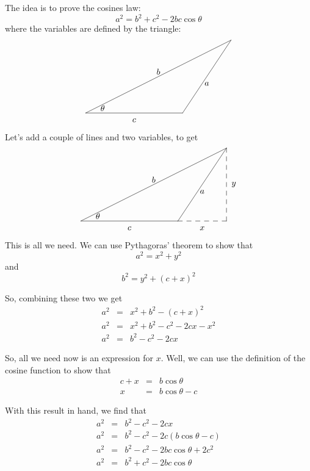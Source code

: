\documentclass{article}
\begin{document}
The idea is to prove the cosines law:
\[
a^2 = b^2 + c^2 - 2bc\cos\theta
\]
where the variables are defined by the triangle:
\[
\begin{xy}
,(0,0)
;(40,0)**@{-}
;(60,30)**@{-}
;(0,0)**@{-}
,(20,-3)*{c}
,(7,2)*{\theta}
,(50,12)*{a}
,(30,17)*{b}
\end{xy}
\]

Let's add a couple of lines and two variables, to get
\[
\begin{xy}
,(0,0)
;(40,0)**@{-}
;(60,30)**@{-}
;(0,0)**@{-}
,(20,-3)*{c}
,(7,2)*{\theta}
,(50,12)*{a}
,(30,17)*{b}
,(40,0)
;(60,0)**@{--}
;(60,30)**@{--}
,(50,-3)*{x}
,(63,15)*{y}
\end{xy}
\]

This is all we need.  We can use Pythagoras' theorem to show that
\[
a^2 = x^2 + y^2
\]
and
\[
b^2 = y^2 + \left(c+x\right)^2
\]

So, combining these two we get
\begin{eqnarray*}
a^2 & = & x^2 + b^2 - \left(c+x\right)^2\\
a^2 & = & x^2 + b^2 - c^2 - 2cx - x^2\\
a^2 & = & b^2 - c^2 - 2cx
\end{eqnarray*}

So, all we need now is an expression for $x$.  Well, we can use the
definition of the cosine function to show that
\begin{eqnarray*}
c + x & = & b \cos\theta\\
x & = & b\cos\theta - c
\end{eqnarray*}

With this result in hand, we find that
\begin{eqnarray}
a^2 & = & b^2 - c^2 - 2cx\nonumber\\
a^2 & = & b^2 - c^2 - 2c\left( b\cos\theta - c\right)\nonumber\\
a^2 & = & b^2 - c^2 -2bc\cos\theta + 2c^2\nonumber\\
a^2 & = & b^2 + c^2 - 2bc\cos\theta
\end{eqnarray}
\end{document}
